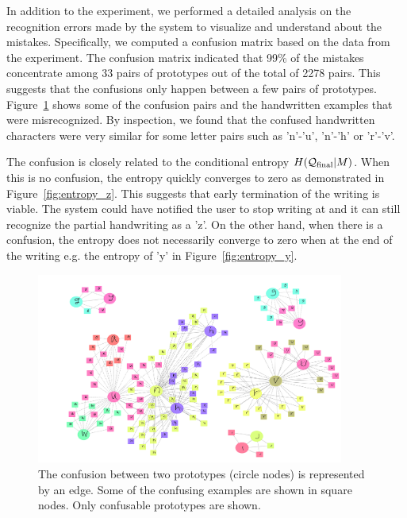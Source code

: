 \documentclass{sigchi}
\begin{document}
In addition to the experiment, we performed a detailed analysis on the
recognition errors made by the system to visualize and understand
about the mistakes. Specifically, we computed a confusion matrix based
on the data from the experiment. The confusion matrix indicated that
99\% of the mistakes concentrate among 33 pairs of prototypes out of
the total of 2278 pairs. This suggests that the confusions only happen
between a few pairs of prototypes. Figure~\ref{fig:prototypes} shows
some of the confusion pairs and the handwritten examples that were
misrecognized. By inspection, we found that the confused handwritten
characters were very similar for some letter pairs such as 'n'-'u',
'n'-'h' or 'r'-'v'.

The confusion is closely related to the conditional entropy
$H(\mathcal{Q}_{\mathrm{final}} | M)$. When this is no confusion, the entropy quickly
converges to zero as demonstrated in Figure~\ref{fig:entropy_z}. This
suggests that early termination of the writing is viable. The system
could have notified the user to stop writing at  and it can
still recognize the partial handwriting as a 'z'. On the other hand,
when there is a confusion, the entropy does not necessarily converge
to zero when at the end of the writing e.g. the entropy of 'y' in
Figure~\ref{fig:entropy_y}.

\begin{figure}
  \centering
  \includegraphics[width=0.9\textwidth]{figures/confusion.pdf}
  \caption{The confusion between two prototypes (circle nodes)
    is represented by an edge. Some of the confusing examples are
    shown in square nodes. Only confusable prototypes are shown. }
  \label{fig:prototypes}
\end{figure}
\end{document}
